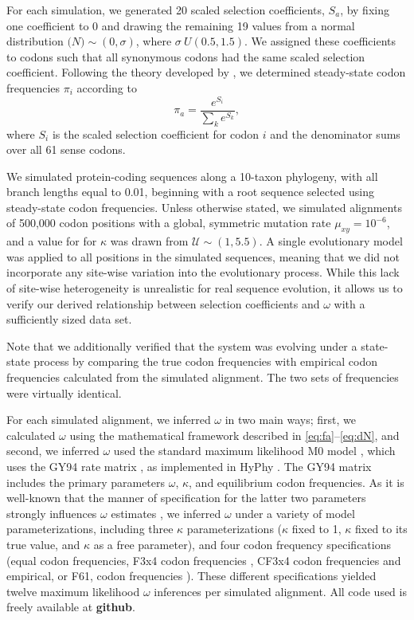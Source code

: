 \documentclass[11pt]{article}
\begin{document}
For each simulation, we generated 20 scaled selection coefficients, $S_a$, by fixing one coefficient to 0 and drawing the remaining 19 values from a normal distribution $\mathcal(N)\sim(0,\sigma)$, where $\sigma ~ U(0.5, 1.5)$. We assigned these coefficients to codons such that all synonymous codons had the same scaled selection coefficient. Following the theory developed by \cite{SellaHirsh2005}, we determined steady-state codon frequencies $\pi_i$ according to \begin{equation} \pi_a = \frac{e^{S_i}}{\sum_k e^{S_k}}, \end{equation} where $S_i$ is the scaled selection coefficient for codon $i$ and the denominator sums over all 61 sense codons. 
 
We simulated protein-coding sequences along a 10-taxon phylogeny, with all branch lengths equal to 0.01, beginning with a root sequence selected using steady-state codon frequencies. Unless otherwise stated, we simulated alignments of 500,000 codon positions with a global, symmetric mutation rate $\mu_{xy} = 10^{-6}$, and a value for for $\kappa$ was drawn from $\mathcal{U} \sim (1,5.5)$. A single evolutionary model was applied to all positions in the simulated sequences, meaning that we did not incorporate any site-wise variation into the evolutionary process. While this lack of site-wise heterogeneity is unrealistic for real sequence evolution, it allows us to verify our derived relationship between selection coefficients and $\omega$ with a sufficiently sized data set.

Note that we additionally verified that the system was evolving under a state-state process by comparing the true codon frequencies with empirical codon frequencies calculated from the simulated alignment. The two sets of frequencies were virtually identical.

For each simulated alignment, we inferred $\omega$ in two main ways; first, we calculated $\omega$ using the mathematical framework described in \eqref{eq:fa}--\eqref{eq:dN}, and second, we inferred $\omega$ used the standard maximum likelihood M0 model \cite{NielsenYang1998}, which uses the GY94 rate matrix \cite{GoldmanYang1994}, as implemented in HyPhy \cite{KosakovskyPondetal2005}. The GY94 matrix includes the primary parameters $\omega$, $\kappa$, and equilibrium codon frequencies. As it is well-known that the manner of specification for the latter two parameters strongly influences $\omega$ estimates \cite{YN00, Yang2006}, we inferred $\omega$ under a variety of model parameterizations, including three $\kappa$ parameterizations ($\kappa$ fixed to 1, $\kappa$ fixed to its true value, and $\kappa$ as a free parameter), and four codon frequency specifications (equal codon frequencies,  F3x4 codon frequencies \cite{MuseGaut1994}, CF3x4 codon frequencies \cite{Pond2010} and empirical, or F61, codon frequencies \cite{GoldmanYang1994}). These different specifications yielded twelve maximum likelihood $\omega$ inferences per simulated alignment. All code used is freely available at \textbf{github}.
\end{document}
